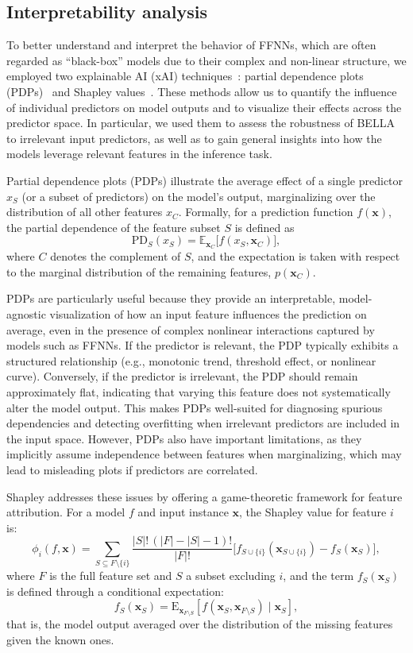 \subsection{Interpretability analysis}

To better understand and interpret the behavior of FFNNs, which are often regarded as ``black-box'' models due to their complex and non-linear structure, we employed two explainable AI (xAI) techniques~\cite{BARREDOARRIETA202082}: partial dependence plots (PDPs)~\cite{friedman2001pdps} and Shapley values~\cite{Merrick2020explaination}.
These methods allow us to quantify the influence of individual predictors on model outputs and to visualize their effects across the predictor space.
In particular, we used them to assess the robustness of BELLA to irrelevant input predictors, as well as to gain general insights into how the models leverage relevant features in the inference task.

Partial dependence plots (PDPs) illustrate the average effect of a single predictor \(x_S\) (or a subset of predictors) on the model’s output, marginalizing over the distribution of all other features \(x_C\). 
Formally, for a prediction function \(f(\mathbf{x})\), the partial dependence of the feature subset \(S\) is defined as
\[
    \mathrm{PD}_S(x_S) = \mathbb{E}_{\mathbf{x}_C} \big[ f(x_S, \mathbf{x}_C) \big],
\]
where \( C \) denotes the complement of \( S \), and the expectation is taken with respect to the marginal distribution of the remaining features, \( p(\mathbf{x}_C) \). 

PDPs are particularly useful because they provide an interpretable, model-agnostic visualization of how an input feature influences the prediction on average, even in the presence of complex nonlinear interactions captured by models such as FFNNs.
If the predictor is relevant, the PDP typically exhibits a structured relationship (e.g., monotonic trend, threshold effect, or nonlinear curve).
Conversely, if the predictor is irrelevant, the PDP should remain approximately flat, indicating that varying this feature does not systematically alter the model output.
This makes PDPs well-suited for diagnosing spurious dependencies and detecting overfitting when irrelevant predictors are included in the input space.
However, PDPs also have important limitations, as they implicitly assume independence between features when marginalizing, which may lead to misleading plots if predictors are correlated.

Shapley addresses these issues by offering a game-theoretic framework for feature attribution.
For a model \( f \) and input instance \( \mathbf{x} \), the Shapley value for feature \( i \) is:
\[
    \phi_i(f, \mathbf{x}) = \sum_{S \subseteq F \setminus \{i\}}
    \frac{|S|! \, (|F|-|S|-1)!}{|F|!}
    \Big[ f_{S \cup \{i\}}(\mathbf{x}_{S \cup \{i\}}) - f_S(\mathbf{x}_S) \Big],
\]
where \( F \) is the full feature set and \( S \) a subset excluding \( i \), and the term \( f_S(\mathbf{x}_S) \) is defined through a conditional expectation:
\[
    f_S(\mathbf{x}_S) = \mathrm{E}_{\mathbf{x}_{F \setminus S}}\!\left[f(\mathbf{x}_S, \mathbf{x}_{F \setminus S}) \mid \mathbf{x}_S \right],
\]
that is, the model output averaged over the distribution of the missing features given the known ones.

